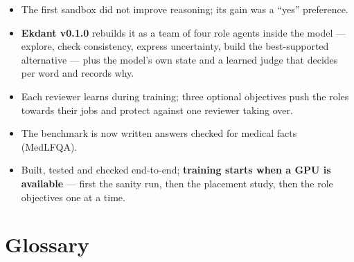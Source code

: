 \documentclass[a4paper,12pt,parskip=half,headsepline]{scrartcl}
\begin{document}
\begin{keybox}[title={Summary}]
\begin{itemize}[leftmargin=1.2em]
\item The first sandbox did not improve reasoning; its gain was a ``yes'' preference.
\item \textbf{Ekdant v0.1.0} rebuilds it as a team of four role agents inside the model ---
explore, check consistency, express uncertainty, build the best-supported alternative ---
plus the model's own state and a learned judge that decides per word and records why.
\item Each reviewer learns during training; three optional objectives push the roles
towards their jobs and protect against one reviewer taking over.
\item The benchmark is now written answers checked for medical facts (MedLFQA).
\item Built, tested and checked end-to-end; \textbf{training starts when a GPU is available}
--- first the sanity run, then the placement study, then the role objectives one at a time.
\end{itemize}
\end{keybox}

\appendix
\section{Glossary}
\end{document}
